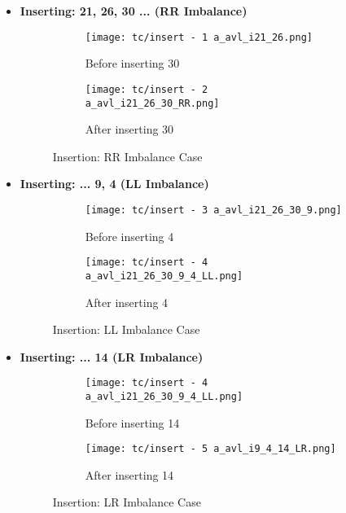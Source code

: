 \documentclass{article}
\begin{document}
\begin{itemize}
    \item \textbf{Inserting: 21, 26, 30 ... (RR Imbalance)}\newline
        \begin{figure}[H]
            \begin{subfigure}{0.5\textwidth}
                \centering
                \texttt{[image: tc/insert - 1 a\_avl\_i21\_26.png]} 
                \caption{Before inserting 30}
            \end{subfigure}
            \begin{subfigure}{0.5\textwidth}
                \centering
                \texttt{[image: tc/insert - 2 a\_avl\_i21\_26\_30\_RR.png]}
                \caption{After inserting 30}
            \end{subfigure}
            \caption{Insertion: RR Imbalance Case}
        \label{fig:Insert_Tree_RR}
        \end{figure}
        
    \item \textbf{Inserting: ... 9, 4 (LL Imbalance)}\newline
        \begin{figure}[H]
            \begin{subfigure}{0.5\textwidth}
                \centering
                \texttt{[image: tc/insert - 3 a\_avl\_i21\_26\_30\_9.png]} 
                \caption{Before inserting 4}
            \end{subfigure}
            \begin{subfigure}{0.5\textwidth}
                \centering
                \texttt{[image: tc/insert - 4 a\_avl\_i21\_26\_30\_9\_4\_LL.png]}
                \caption{After inserting 4}
            \end{subfigure}
            \caption{Insertion: LL Imbalance Case}
        \label{fig:Insert_Tree_LL}
        \end{figure}
        
    \item \textbf{Inserting: ... 14 (LR Imbalance)}\newline
        \begin{figure}[H]
            \begin{subfigure}{0.5\textwidth}
                \centering
                \texttt{[image: tc/insert - 4 a\_avl\_i21\_26\_30\_9\_4\_LL.png]} 
                \caption{Before inserting 14}
            \end{subfigure}
            \begin{subfigure}{0.5\textwidth}
                \centering
                \texttt{[image: tc/insert - 5 a\_avl\_i9\_4\_14\_LR.png]}
                \caption{After inserting 14}
            \end{subfigure}
            \caption{Insertion: LR Imbalance Case}
        \label{fig:Insert_Tree_LR}
        \end{figure}
        

\end{itemize}
\end{document}

